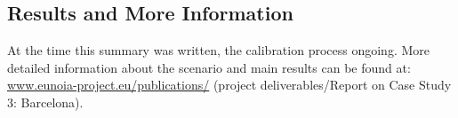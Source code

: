\subsection{Results and More Information}
At the time this summary was written, the calibration process ongoing. More detailed information about the scenario and main results can be found at:
\url{www.eunoia-project.eu/publications/} (project deliverables/Report on Case Study 3: Barcelona).

